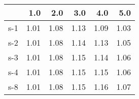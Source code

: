 \begin{tabular}{lrrrrr}
\toprule
{} &  1.0 &  2.0 &  3.0 &  4.0 &  5.0 \\
\midrule
s-1 & 1.01 & 1.08 & 1.13 & 1.09 & 1.03 \\
s-2 & 1.01 & 1.08 & 1.14 & 1.13 & 1.05 \\
s-3 & 1.01 & 1.08 & 1.15 & 1.14 & 1.06 \\
s-4 & 1.01 & 1.08 & 1.15 & 1.15 & 1.06 \\
s-8 & 1.01 & 1.08 & 1.15 & 1.16 & 1.07 \\
\bottomrule
\end{tabular}

